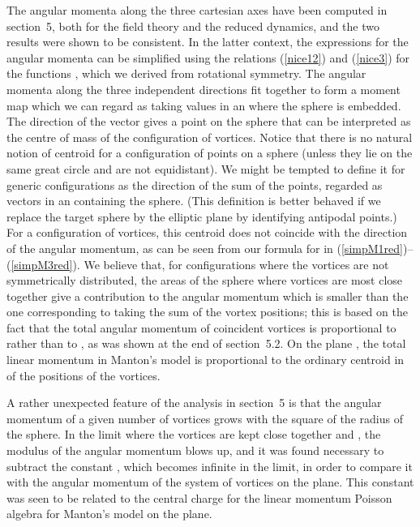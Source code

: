 \documentclass[a4paper,11pt]{article}
\begin{document}
The angular momenta along the three cartesian axes have been computed 
in section~5, both for the field theory and the reduced dynamics,
and the two results were shown to be consistent. In the latter
context, the expressions for the angular momenta can be simplified
using the relations (\ref{nice12}) and (\ref{nice3}) for the functions
\coordHE{}, which we derived from rotational symmetry. The angular momenta
along the three independent directions fit together to form a moment
map \coordHE{} which we can regard as taking values in
an \coordHE{} where the sphere \myHighlight{$\Sigma$}\coordHE{}
is embedded. The direction of the vector \coordHE{}
gives a point on the sphere that can be interpreted as the
centre of mass of the configuration of \coordHE{} vortices. 
Notice that there is no natural notion of
centroid for a configuration of \coordHE{} points on a sphere (unless
they lie on the same great circle and are not equidistant). We might be
tempted to define it for generic configurations as the direction of the 
sum of the points,
regarded as vectors in an \coordHE{} containing the sphere.
(This definition is better behaved if we replace the target
sphere by the elliptic plane by identifying antipodal points.)
For a configuration of vortices, this centroid does not coincide
with the direction of the angular momentum, as can be seen from our
formula for \coordHE{} in (\ref{simpM1red})--(\ref{simpM3red}).  
We believe that, for configurations where the vortices are not symmetrically
distributed, the areas of the sphere where vortices are most close
together give a contribution to the angular momentum which is smaller
than the one corresponding to taking the sum of the vortex positions; this is
based on the fact that the total angular momentum of \coordHE{} coincident 
vortices is proportional to \coordHE{} rather than to \coordHE{}, as was
shown at the end of section~5.2. On the plane \cite{MNcl}, the
total linear momentum in Manton's model is
proportional to the ordinary centroid in \coordHE{} of the 
positions of the vortices.


A rather unexpected feature of the analysis in section~5 is that the
angular momentum of a given number of vortices grows with the square
of the radius \coordHE{} of the sphere. In the limit where the vortices are
kept close together and \coordHE{}, the modulus of the
angular momentum blows up, and it was found necessary to subtract the
constant \coordHE{}, which becomes infinite in the limit, in 
order to compare it with the angular momentum of the system of
vortices on the plane. This constant was seen to be related to the
central charge for the linear momentum Poisson algebra for 
Manton's model on the plane.
\end{document}
